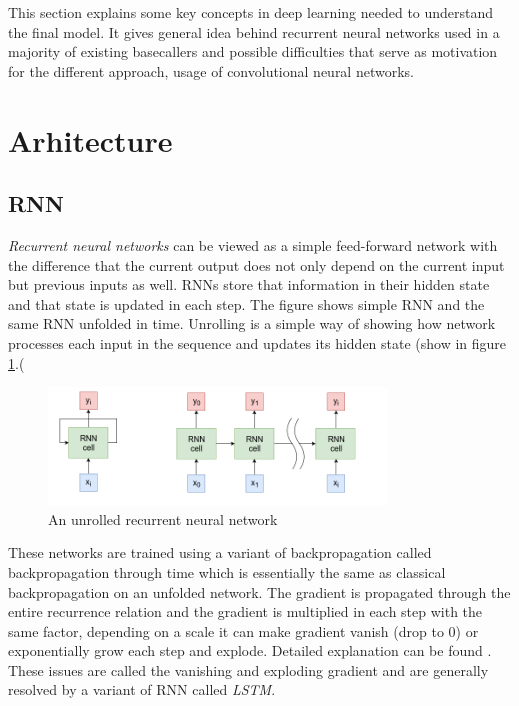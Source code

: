 \documentclass[times, utf8, diplomski, numeric, english]{fer}
\begin{document}
This section explains some key concepts in deep learning needed to understand the final model. It gives general idea behind recurrent neural networks used in a majority of existing basecallers and possible difficulties that serve as motivation for the different approach, usage of convolutional neural networks. 

\section{Arhitecture}

\subsection{RNN}
\textit{Recurrent neural networks} can be viewed as a simple feed-forward network with the difference that the current output does not only depend on the current input but previous inputs as well. RNNs store that information in their hidden state and that state is updated in each step. The figure shows simple RNN and the same RNN unfolded in time.  Unrolling is a simple way of showing how network processes each input in the sequence and updates its hidden state (show in figure  \ref{fg:rnn}.( 
\begin{figure}[!ht]
	\begin{center}
		\includegraphics[width=0.8\textwidth]{./imgs/rnn.png}
		\caption{An unrolled recurrent neural network}
		\label{fg:rnn}
	\end{center}
\end{figure}

These networks are trained using a variant of backpropagation called backpropagation through time which is essentially the same as classical backpropagation on an unfolded network. The gradient is propagated through the entire recurrence relation and the gradient is multiplied in each step with the same factor, depending on a scale it can make gradient vanish (drop to 0) or exponentially grow each step and explode. Detailed explanation can be found \cite{rnn-blog}. These issues are called the vanishing and exploding gradient\cite{rnn-blog} and are generally resolved by a variant of RNN called \textit{LSTM}\cite{hochreiter1997long}. 
\end{document}
